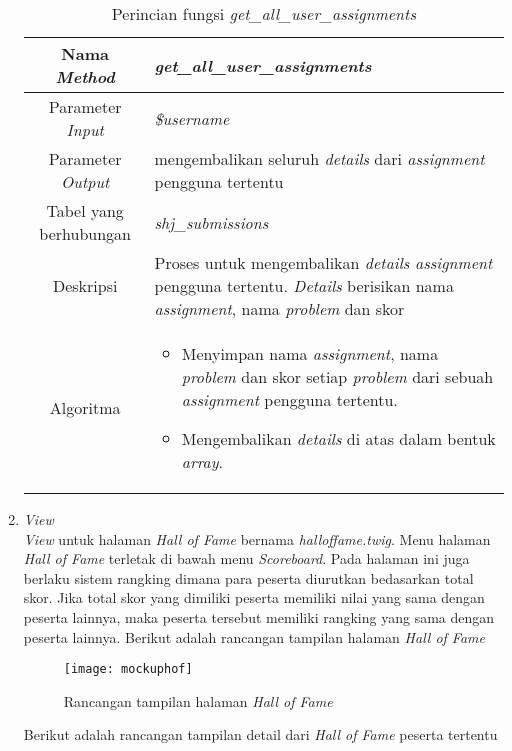 \begin{enumerate}
	\begin{table}[H]
		\caption{Perincian fungsi \textit{get\_all\_user\_assignments}}
		\begin{tabular}{|c|p{11cm}|}
			\hline
			Nama \textit{Method} 	& 	\textit{get\_all\_user\_assignments} 	\\
			\hline
			Parameter \textit{Input} & \textit{\$username} \\
			\hline
			Parameter \textit{Output} &  mengembalikan seluruh \textit{details} dari \textit{assignment} pengguna tertentu\\
			\hline
			Tabel yang berhubungan & \textit{shj\_submissions} \\
			\hline
			Deskripsi	& Proses untuk mengembalikan \textit{details assignment} pengguna tertentu. \textit{Details} berisikan nama \textit{assignment}, nama \textit{problem} dan skor \\
			\hline
			Algoritma	& \begin{itemize}
				\item Menyimpan nama \textit{assignment}, nama \textit{problem} dan skor setiap \textit{problem} dari sebuah \textit{assignment} pengguna tertentu.
				\item Mengembalikan \textit{details} di atas dalam bentuk \textit{array}.
			\end{itemize} \\
			\hline
		\end{tabular}
	\end{table}
	
	\item \textit{View} \\
	\textit{View} untuk halaman \textit{Hall of Fame} bernama \textit{halloffame.twig}. Menu halaman \textit{Hall of Fame} terletak di bawah menu \textit{Scoreboard}. Pada halaman ini juga berlaku sistem rangking dimana para peserta diurutkan bedasarkan total skor. Jika total skor yang dimiliki peserta memiliki nilai yang sama dengan peserta lainnya, maka peserta tersebut memiliki rangking yang sama dengan peserta lainnya. Berikut adalah rancangan tampilan halaman \textit{Hall of Fame}
	
	\begin{figure}[H]
		\centering  
		\texttt{[image: mockuphof]}  
		\caption[Rancangan tampilan halaman \textit{Hall of Fame}]{Rancangan tampilan halaman \textit{Hall of Fame}} 
		\label{fig:mockuphof} 
	\end{figure}

	Berikut adalah rancangan tampilan detail dari \textit{Hall of Fame} peserta tertentu
	

\end{enumerate}
